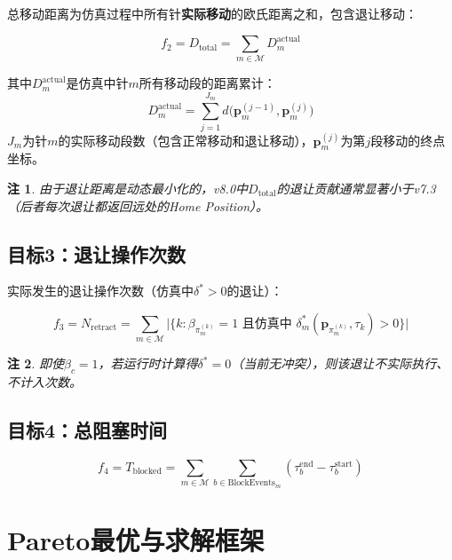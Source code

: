 \documentclass[11pt,a4paper]{article}
\newtheorem{remark}{注}[section]
\begin{document}
总移动距离为仿真过程中所有针\textbf{实际移动}的欧氏距离之和，包含退让移动：

\begin{equation}
    f_2 = D_{\text{total}} = \sum_{m \in \mathcal{M}} D_m^{\text{actual}}
\end{equation}

其中$D_m^{\text{actual}}$是仿真中针$m$所有移动段的距离累计：
\begin{equation}
    D_m^{\text{actual}} = \sum_{j=1}^{J_m} d\big(\mathbf{p}_m^{(j-1)}, \mathbf{p}_m^{(j)}\big)
\end{equation}
$J_m$为针$m$的实际移动段数（包含正常移动和退让移动），$\mathbf{p}_m^{(j)}$为第$j$段移动的终点坐标。

\begin{remark}
由于退让距离是动态最小化的，v8.0中$D_{\text{total}}$的退让贡献通常显著小于v7.3（后者每次退让都返回远处的Home Position）。
\end{remark}

\subsection{目标3：退让操作次数}

实际发生的退让操作次数（仿真中$\delta^* > 0$的退让）：

\begin{equation}
    f_3 = N_{\text{retract}} = \sum_{m \in \mathcal{M}} \big|\{k : \beta_{\pi_m^{(k)}} = 1 \text{ 且仿真中 } \delta_m^*(\mathbf{p}_{\pi_m^{(k)}}, \tau_k) > 0\}\big|
\end{equation}

\begin{remark}
即使$\beta_c = 1$，若运行时计算得$\delta^* = 0$（当前无冲突），则该退让不实际执行、不计入次数。
\end{remark}

\subsection{目标4：总阻塞时间}

\begin{equation}
    f_4 = T_{\text{blocked}} = \sum_{m \in \mathcal{M}} \sum_{b \in \text{BlockEvents}_m} (\tau_b^{\text{end}} - \tau_b^{\text{start}})
\end{equation}

\section{Pareto最优与求解框架}
\end{document}
